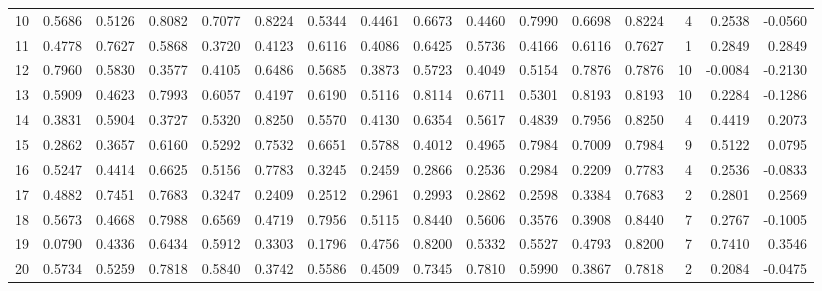 \begin{tabular}{lrrrrrrrrrrrrrrr}
10  &      0.5686 &  0.5126 &  0.8082 &  0.7077 &  0.8224 &  0.5344 &  0.4461 &  0.6673 &  0.4460 &  0.7990 &   0.6698 &     0.8224 &      4 &                    0.2538 &                    -0.0560 \\
11  &      0.4778 &  0.7627 &  0.5868 &  0.3720 &  0.4123 &  0.6116 &  0.4086 &  0.6425 &  0.5736 &  0.4166 &   0.6116 &     0.7627 &      1 &                    0.2849 &                     0.2849 \\
12  &      0.7960 &  0.5830 &  0.3577 &  0.4105 &  0.6486 &  0.5685 &  0.3873 &  0.5723 &  0.4049 &  0.5154 &   0.7876 &     0.7876 &     10 &                   -0.0084 &                    -0.2130 \\
13  &      0.5909 &  0.4623 &  0.7993 &  0.6057 &  0.4197 &  0.6190 &  0.5116 &  0.8114 &  0.6711 &  0.5301 &   0.8193 &     0.8193 &     10 &                    0.2284 &                    -0.1286 \\
14  &      0.3831 &  0.5904 &  0.3727 &  0.5320 &  0.8250 &  0.5570 &  0.4130 &  0.6354 &  0.5617 &  0.4839 &   0.7956 &     0.8250 &      4 &                    0.4419 &                     0.2073 \\
15  &      0.2862 &  0.3657 &  0.6160 &  0.5292 &  0.7532 &  0.6651 &  0.5788 &  0.4012 &  0.4965 &  0.7984 &   0.7009 &     0.7984 &      9 &                    0.5122 &                     0.0795 \\
16  &      0.5247 &  0.4414 &  0.6625 &  0.5156 &  0.7783 &  0.3245 &  0.2459 &  0.2866 &  0.2536 &  0.2984 &   0.2209 &     0.7783 &      4 &                    0.2536 &                    -0.0833 \\
17  &      0.4882 &  0.7451 &  0.7683 &  0.3247 &  0.2409 &  0.2512 &  0.2961 &  0.2993 &  0.2862 &  0.2598 &   0.3384 &     0.7683 &      2 &                    0.2801 &                     0.2569 \\
18  &      0.5673 &  0.4668 &  0.7988 &  0.6569 &  0.4719 &  0.7956 &  0.5115 &  0.8440 &  0.5606 &  0.3576 &   0.3908 &     0.8440 &      7 &                    0.2767 &                    -0.1005 \\
19  &      0.0790 &  0.4336 &  0.6434 &  0.5912 &  0.3303 &  0.1796 &  0.4756 &  0.8200 &  0.5332 &  0.5527 &   0.4793 &     0.8200 &      7 &                    0.7410 &                     0.3546 \\
20  &      0.5734 &  0.5259 &  0.7818 &  0.5840 &  0.3742 &  0.5586 &  0.4509 &  0.7345 &  0.7810 &  0.5990 &   0.3867 &     0.7818 &      2 &                    0.2084 &                    -0.0475 \\

\end{tabular}
